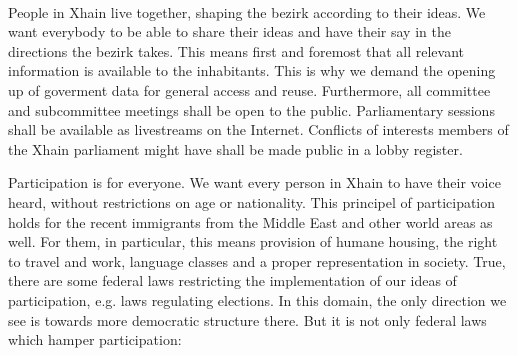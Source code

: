 \documentclass[a4paper,10pt]{article}
\newcommand{\mysection}[1]{{\vspace{1cm}\noindent\color{gray}{\ttfamily\LARGE\raggedright #1}\\\medskip}}
\begin{document}







\mysection{Preamble}%

People in Xhain live together, shaping the bezirk according to their ideas. We want everybody to be able to share their ideas and have their say in the directions the bezirk takes. This means first and foremost that all relevant information is available to the inhabitants. This is why we demand the opening up of goverment data for general access and reuse. Furthermore, all committee and subcommittee meetings shall be open to the public. Parliamentary sessions shall be available as livestreams on the Internet. Conflicts of interests members of the Xhain parliament might have shall be made public in a lobby register.

Participation is for everyone. We want every person in Xhain to have their voice heard, without restrictions on age or nationality. This principel of participation holds for the recent immigrants from the Middle East and other world areas as well. For them, in particular, this means provision of humane housing, the right to travel and work, language classes and a proper representation in society. True, there are some federal laws restricting the implementation of our ideas of participation, e.g. laws regulating elections. In this domain, the only direction we see is towards more democratic structure there. But it is not only federal laws which hamper participation:
\end{document}
